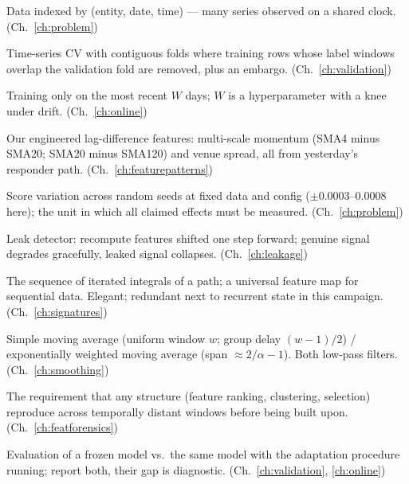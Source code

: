 \begin{description}[style=nextline, itemsep=2pt]
\item[Panel] Data indexed by (entity, date, time) --- many series
observed on a shared clock. (Ch.~\ref{ch:problem})

\item[Purged $k$-fold] Time-series CV with contiguous folds where
training rows whose label windows overlap the validation fold are
removed, plus an embargo. (Ch.~\ref{ch:validation})

\item[Recency window] Training only on the most recent $W$ days;
$W$ is a hyperparameter with a knee under drift. (Ch.~\ref{ch:online})

\item[rsig block] Our engineered lag-difference features: multi-scale
momentum (SMA4 minus SMA20; SMA20 minus SMA120) and venue spread, all
from yesterday's responder path. (Ch.~\ref{ch:featurepatterns})

\item[Seed noise] Score variation across random seeds at fixed data and
config ($\pm 0.0003$--$0.0008$ here); the unit in which all claimed
effects must be measured. (Ch.~\ref{ch:problem})

\item[Shift test] Leak detector: recompute features shifted one step
forward; genuine signal degrades gracefully, leaked signal collapses.
(Ch.~\ref{ch:leakage})

\item[Signature (path signature)] The sequence of iterated integrals of
a path; a universal feature map for sequential data. Elegant; redundant
next to recurrent state in this campaign. (Ch.~\ref{ch:signatures})

\item[SMA / EWMA] Simple moving average (uniform window $w$; group delay
$(w{-}1)/2$) / exponentially weighted moving average (span
$\approx 2/\alpha - 1$). Both low-pass filters. (Ch.~\ref{ch:smoothing})

\item[Stability gate] The requirement that any structure (feature
ranking, clustering, selection) reproduce across temporally distant
windows before being built upon. (Ch.~\ref{ch:featforensics})

\item[Static vs.\ online score] Evaluation of a frozen model vs.\ the
same model with the adaptation procedure running; report both, their
gap is diagnostic. (Ch.~\ref{ch:validation}, \ref{ch:online})


\end{description}
